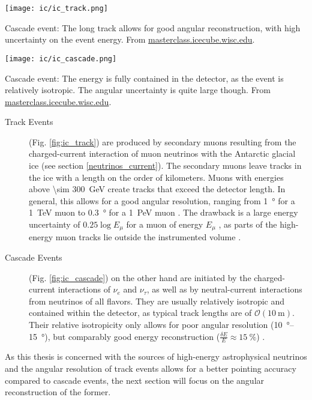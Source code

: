 \begin{marginfigure}
    \texttt{[image: ic/ic\_track.png]}
    \caption[Track event in IceCube]{Cascade event: The long track allows for good angular reconstruction, with high uncertainty on the event energy. From \url{masterclass.icecube.wisc.edu}.}
\end{marginfigure}
\begin{marginfigure}
    \texttt{[image: ic/ic\_cascade.png]}
    \caption[Cascade event in IceCube]{Cascade event: The energy is fully contained in the detector, as the event is relatively isotropic. The angular uncertainty is quite large though. From \url{masterclass.icecube.wisc.edu}.}
\end{marginfigure}
\begin{description}
    \item[Track Events] (Fig. \ref{fig:ic_track}) are produced by secondary muons resulting from the charged-current interaction of muon neutrinos with the Antarctic glacial ice (see section \ref{neutrinos_current}). The secondary muons leave tracks in the ice with a length on the order of kilometers. Muons with energies above \SI{\sim 300}{\giga\eV} create tracks that exceed the detector length. In general, this allows for a good angular resolution, ranging from \SI{1}{\degree} for a \SI{1}{\TeV} muon to \SI{0.3}{\degree} for a \SI{1}{\peta\eV} muon . The drawback is a large energy uncertainty of $0.25 \log{E_\mu}$ for a muon of energy $E_\mu$ , as parts of the high-energy muon tracks lie outside the instrumented volume .

    \item[Cascade Events] (Fig. \ref{fig:ic_cascade}) on the other hand are initiated by the charged-current interactions of $\nu_e$ and $\nu_\tau$, as well as by neutral-current interactions from neutrinos of all flavors. They are usually relatively isotropic and contained within the detector, as typical track lengths are of $\mathcal{O}(\SI{10}{\meter})$. Their relative isotropicity only allows for poor angular resolution (\SIrange{10}{15}{\degree}), but comparably good energy reconstruction ($\frac{\delta E}{E} \approx \SI{15}{\percent}$) \cite{Aartsen2017a}.
\end{description}

As this thesis is concerned with the sources of high-energy astrophysical neutrinos and the angular resolution of track events allows for a better pointing accuracy compared to cascade events, the next section will focus on the angular reconstruction of the former.

